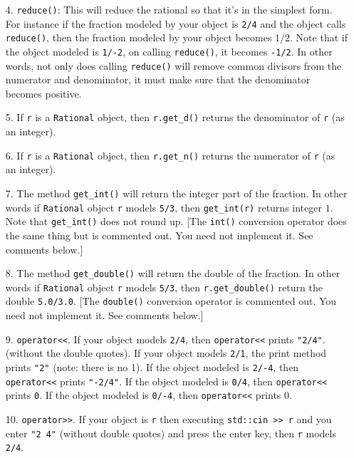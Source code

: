 \begin{itemize}
\item[4.]
\texttt{reduce()}:
This will reduce the rational so that it's in the simplest form.
For instance if the fraction modeled by your object is \texttt{2/4} and the
object calls \texttt{reduce()}, then the fraction modeled by your object
becomes $1/2$.
Note that if the object modeled is \texttt{1/-2}, on calling \texttt{reduce()},
it becomes \texttt{-1/2}.
In other words, not only does calling \texttt{reduce()} will remove common
divisors from the numerator and denominator,
it must make sure that the denominator becomes positive.

\item[5.]
If \texttt{r} is a \texttt{Rational} object, then \texttt{r.get\_d()}
returns the denominator of \texttt{r} (as an integer).

\item[6.]
If \texttt{r} is a \texttt{Rational} object, then \texttt{r.get\_n()}
returns the numerator of \texttt{r} (as an integer).

\item[7.]
The method \texttt{get\_int()} will return the integer part of the fraction.
In other words
if \texttt{Rational} object \texttt{r} models \texttt{5/3},
then \texttt{get\_int(r)} returns integer $1$.
Note that
\texttt{get\_int()} does not round up.
[The \texttt{int()} conversion operator
does the same thing but is commented out. You
need not implement it. See comments below.]

\item[8.]
The method \verb!get_double()! will return the double of the fraction.
In other words if \texttt{Rational} object \texttt{r} models \texttt{5/3},
then \texttt{r.get\_double()} return the double \texttt{5.0/3.0}.
[The \texttt{double()} conversion operator is commented out.
You need not implement it. See comments below.]


\item[9.]
\texttt{operator<<}.
If your object models \texttt{2/4},
then \texttt{operator<<} prints \texttt{"2/4"}.(without the double quotes).
If your object models \texttt{2/1}, the print method prints \texttt{"2"}
(note: there is no 1).
If the object
modeled is \texttt{2/-4}, then \texttt{operator<<} prints
\texttt{"-2/4"}.
If the object modeled is \verb!0/4!, then
\texttt{operator<<} prints \texttt{0}.
If the object modeled is \verb!0/-4!, then
\texttt{operator<<} prints $0$.

\item[10.]
\texttt{operator>>}.
If your object is \texttt{r} then executing
\texttt{std::cin >> r} and you enter \texttt{"2 4"}
(without double quotes) and press the enter key,
then \texttt{r} models \texttt{2/4}.


\end{itemize}
